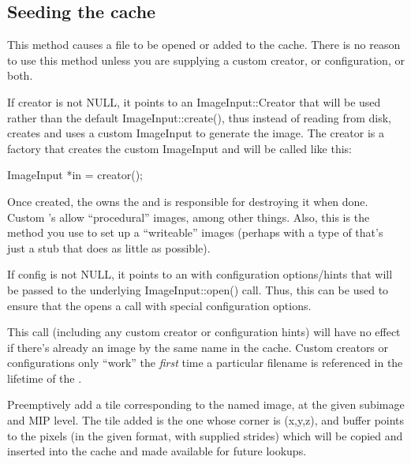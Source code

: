 \subsection{Seeding the cache}
\label{sec:imagecache:api:seeding}
This method causes a file to be opened or added to the
cache. There is no reason to use this method unless you are supplying
a custom creator, or configuration, or both.

If {\cf creator} is not NULL, it points to an {\cf ImageInput::Creator} that
will be used rather than the default {\cf ImageInput::create()}, thus
instead of reading from disk, creates and uses a custom ImageInput
to generate the image. The {\cf creator} is a factory that creates the
custom ImageInput and will be called like this:
\begin{code}
    ImageInput *in = creator();
\end{code}
Once created, the \ImageCache owns the \ImageInput and is responsible
for destroying it when done. Custom \ImageInput's allow ``procedural''
images, among other things.  Also, this is the method you use to set
up a ``writeable'' \ImageCache images (perhaps with a type of
\ImageInput that's just a stub that does as little as possible).

If {\cf config} is not NULL, it points to an \ImageSpec with configuration
options/hints that will be passed to the underlying
{\cf ImageInput::open()} call. Thus, this can be used to ensure that the
\ImageCache opens a call with special configuration options.

This call (including any custom creator or configuration hints) will
have no effect if there's already an image by the same name in the
cache. Custom creators or configurations only ``work'' the \emph{first} time
a particular filename is referenced in the lifetime of the
\ImageCache.
\apiend

Preemptively add a tile corresponding to the named image, at the
given subimage and MIP level.  The tile added is the one whose
corner is (x,y,z), and buffer points to the pixels (in the given
format, with supplied strides) which will be copied and inserted
into the cache and made available for future lookups.
\apiend

